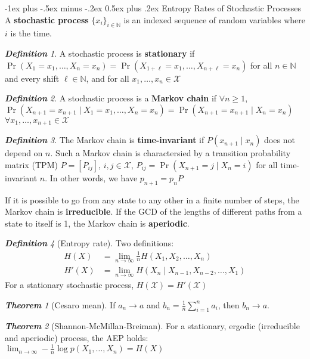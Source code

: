 \documentclass[frenchspacing,9pt,landscape,a4paper]{article}
\makeatletter
\renewcommand{\section}{\@startsection{section}{1}{0mm}%
                                {-1ex plus -.5ex minus -.2ex}%
                                {0.5ex plus .2ex}%
                                {\normalfont\large\bfseries}}
\newcommand{\BN}{\mathbb N}
\DeclareMathOperator{\pr}{Pr}
\theoremstyle{remark}
\newtheorem*{thm}{\textbf{Theorem}}
\newtheorem*{defn}{\textbf{Definition}}
\makeatother
\begin{document}
\begin{multicols}{4}
\section{Entropy Rates of Stochastic Processes}
A \textbf{stochastic process} $\{x_i\}_{i\in\BN}$ is an indexed sequence of random variables where  $i$ is
the time.
\begin{defn}
    A stochastic process is \textbf{stationary} if
    $\pr(X_1=x_1,\dots,X_n=x_n)=\pr(X_{1+\ell}=x_1,\dots,X_{n+\ell}=x_n)$ for all $n\in\BN$ and every shift
    $\ell\in\BN$, and for all $x_1,\dots,x_n\in\mathcal{X}$
\end{defn}
\begin{defn}
    A stochastic process is a \textbf{Markov chain} if $\forall n\geq 1$,  $\pr(X_{n+1}=x_{n+1}\mid
    X_1=x_1,\dots,X_n=x_n)=\pr(X_{n+1}=x_{n+1}\mid X_n=x_n)$ $\forall x_1,\dots,x_{n+1}\in\mathcal{X}$
\end{defn}
\begin{defn}
    The Markov chain is \textbf{time-invariant} if $P(x_{n+1}\mid x_n)$ does not depend on  $n$. Such a
    Markov chain is charactersied by a transition probability matrix (TPM)  $P=[P_{ij}]$,
    $i,j\in\mathcal{X}$,  $P_{ij}=\pr(X_{n+1}=j\mid X_n=i)$ for all time-invariant  $n$. In other words, we
    have  $p_{n+1}=p_nP$
\end{defn}
If it is possible to go from any state to any other in a finite number of steps, the Markov chain is
\textbf{irreducible}. If the GCD of the lengths of different paths from a state to itself is 1, the Markov
chain is \textbf{aperiodic}.
\begin{defn}[Entropy rate]
    Two definitions:
    \begin{align*}
        H(X)&=\lim_{n\to\infty}\frac{1}{n}H(X_1,X_2,\dots,X_n)\\
        H'(X)&=\lim_{n\to\infty}H(X_n\mid X_{n-1},X_{n-2},\dots,X_1)
    \end{align*} For a stationary stochastic process, $H(\mathcal{X})=H'(\mathcal{X})$
\end{defn}
\begin{thm}[Cesaro mean]
    If $a_n\to a$ and  $b_n=\frac{1}{n}\sum_{i=1}^n a_i$, then $b_n\to a$.
\end{thm}
\begin{thm}[Shannon-McMillan-Breiman]
    For a stationary, ergodic (irreducible and aperiodic) process, the AEP holds: $\lim_{n\to\infty}-\frac{1}{n}\log
    p(X_1,\dots,X_n)=H(X)$
\end{thm}
\begin{itemize}

\end{itemize}
\end{multicols}
\end{document}
